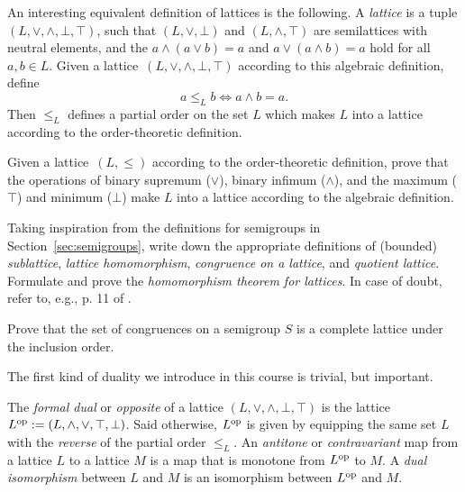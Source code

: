 An interesting equivalent definition of lattices is the following. A \emph{lattice} is a tuple $(L,\vee,\wedge,\bot,\top)$, such that $(L, \vee, \bot)$ and $(L,\wedge, \top)$ are semilattices with neutral elements, and the  $a \wedge (a \vee b) = a$ and $a \vee (a \wedge b) = a$ hold for all $a, b \in L$. 
% 
Given a lattice~$(L,\vee,\wedge,\bot,\top)$ according to this algebraic definition, define
\[ a \leq_L b \iff a \wedge b = a.\]
Then $\leq_L$ defines a partial order on the set $L$ which makes $L$ into a lattice according to the order-theoretic definition.

\begin{exercise}\easy
Given a lattice~${(L,\leq)}$ according to the order-theoretic definition, prove that the operations of binary supremum ($\vee$), binary infimum ($\wedge$), and the maximum ($\top$) and minimum ($\bot$) make $L$ into a lattice according to the algebraic definition.
\end{exercise}

\begin{exercise}\medium
Taking inspiration from the definitions for semigroups in Section~\ref{sec:semigroups}, write down the appropriate definitions of (bounded) \emph{sublattice}, \emph{lattice homomorphism}, \emph{congruence on a lattice}, and \emph{quotient lattice}. Formulate and prove the \emph{homomorphism theorem for lattices}. In case of doubt, refer to, e.g., p. 11 of \cite{thebook}.
\end{exercise}

\begin{exercise}\medium\label{exe:conlattice}
Prove that the set of congruences on a semigroup $S$ is a complete lattice under the inclusion order.
\end{exercise}
The first kind of duality we introduce in this course is trivial, but important. 
\begin{definition}
  The \emph{formal dual} or \emph{opposite} of a lattice $(L, \vee, \wedge, \bot, \top)$ is the lattice $L^{\mathrm{op}} := (L, \wedge, \vee, \top, \bot)$. Said otherwise, $L^{\mathrm{op}}$ is given by equipping the same set $L$ with the \emph{reverse} of the partial order $\leq_L$. An \emph{antitone} or \emph{contravariant} map from a lattice $L$ to a lattice $M$ is a map that is monotone from $L^{\mathrm{op}}$ to $M$. A \emph{dual isomorphism} between $L$ and $M$ is an isomorphism between $L^{\mathrm{op}}$ and $M$.
\end{definition}

